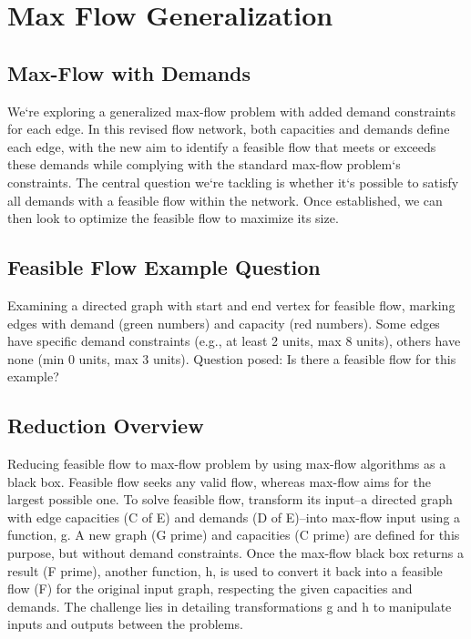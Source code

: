 \section*{Max Flow Generalization}

\subsection*{Max-Flow with Demands}
We`re exploring a generalized max-flow problem with added demand constraints for each edge.
In this revised flow network, both capacities and demands define each edge, with the new aim to identify a feasible flow that meets or exceeds these demands while complying with the standard max-flow problem`s constraints.
The central question we`re tackling is whether it`s possible to satisfy all demands with a feasible flow within the network.
Once established, we can then look to optimize the feasible flow to maximize its size.

\subsection*{Feasible Flow Example Question}
Examining a directed graph with start and end vertex for feasible flow, marking edges with demand (green numbers) and capacity (red numbers).
Some edges have specific demand constraints (e.g., at least 2 units, max 8 units), others have none (min 0 units, max 3 units).
Question posed: Is there a feasible flow for this example?

\subsection*{Reduction Overview}
Reducing feasible flow to max-flow problem by using max-flow algorithms as a black box.
Feasible flow seeks any valid flow, whereas max-flow aims for the largest possible one.
To solve feasible flow, transform its input--a directed graph with edge capacities (C of E) and demands (D of E)--into max-flow input using a function, g.
A new graph (G prime) and capacities (C prime) are defined for this purpose, but without demand constraints.
Once the max-flow black box returns a result (F prime), another function, h, is used to convert it back into a feasible flow (F) for the original input graph, respecting the given capacities and demands.
The challenge lies in detailing transformations g and h to manipulate inputs and outputs between the problems.

